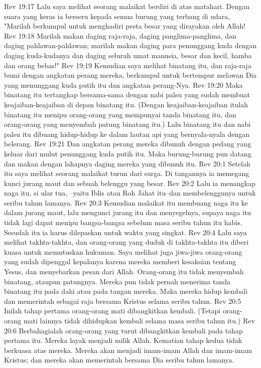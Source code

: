 Rev 19:17  Lalu saya melihat seorang malaikat berdiri di atas matahari. Dengan suara yang keras ia berseru kepada semua burung yang terbang di udara, "Marilah berkumpul untuk menghadiri pesta besar yang dirayakan oleh Allah!
Rev 19:18  Marilah makan daging raja-raja, daging panglima-panglima, dan daging pahlawan-pahlawan; marilah makan daging para penunggang kuda dengan daging kuda-kudanya dan daging seluruh umat manusia, besar dan kecil, hamba dan orang bebas!"
Rev 19:19  Kemudian saya melihat binatang itu, dan raja-raja bumi dengan angkatan perang mereka, berkumpul untuk bertempur melawan Dia yang menunggang kuda putih itu dan angkatan perang-Nya.
Rev 19:20  Maka binatang itu tertangkap bersama-sama dengan nabi palsu yang sudah membuat keajaiban-keajaiban di depan binatang itu. (Dengan keajaiban-keajaiban itulah binatang itu menipu orang-orang yang mempunyai tanda binatang itu, dan orang-orang yang menyembah patung binatang itu.) Lalu binatang itu dan nabi palsu itu dibuang hidup-hidup ke dalam lautan api yang bernyala-nyala dengan belerang.
Rev 19:21  Dan angkatan perang mereka dibunuh dengan pedang yang keluar dari mulut penunggang kuda putih itu. Maka burung-burung pun datang dan makan dengan lahapnya daging mereka yang dibunuh itu.
Rev 20:1  Setelah itu saya melihat seorang malaikat turun dari surga. Di tangannya ia memegang kunci jurang maut dan sebuah belenggu yang besar.
Rev 20:2  Lalu ia menangkap naga itu, si ular tua, --yaitu Iblis atau Roh Jahat itu--dan membelenggunya untuk seribu tahun lamanya.
Rev 20:3  Kemudian malaikat itu membuang naga itu ke dalam jurang maut, lalu mengunci jurang itu dan menyegelnya, supaya naga itu tidak lagi dapat menipu bangsa-bangsa sebelum masa seribu tahun itu habis. Sesudah itu ia harus dilepaskan untuk waktu yang singkat.
Rev 20:4  Lalu saya melihat takhta-takhta, dan orang-orang yang duduk di takhta-takhta itu diberi kuasa untuk memutuskan hukuman. Saya melihat juga jiwa-jiwa orang-orang yang sudah dipenggal kepalanya karena mereka memberi kesaksian tentang Yesus, dan menyebarkan pesan dari Allah. Orang-orang itu tidak menyembah binatang, ataupun patungnya. Mereka pun tidak pernah menerima tanda binatang itu pada dahi atau pada tangan mereka. Maka mereka hidup kembali dan memerintah sebagai raja bersama Kristus selama seribu tahun.
Rev 20:5  Inilah tahap pertama orang-orang mati dibangkitkan kembali. (Tetapi orang-orang mati lainnya tidak dihidupkan kembali selama masa seribu tahun itu.)
Rev 20:6  Berbahagialah orang-orang yang turut dibangkitkan kembali pada tahap pertama itu. Mereka layak menjadi milik Allah. Kematian tahap kedua tidak berkuasa atas mereka. Mereka akan menjadi imam-imam Allah dan imam-imam Kristus; dan mereka akan memerintah bersama Dia seribu tahun lamanya.
